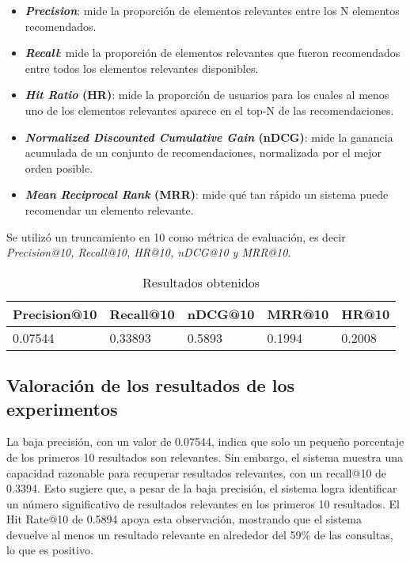 \documentclass[runningheads]{llncs}
\begin{document}
\begin{itemize}
    \item \textbf{\textit{Precision}}: mide la proporción de elementos relevantes entre los N elementos recomendados.
    \item \textbf{\textit{Recall}}: mide la proporción de elementos relevantes que fueron recomendados entre todos los elementos relevantes disponibles.
    \item \textbf{\textit{Hit Ratio} (HR)}: mide la proporción de usuarios para los cuales al menos uno de los elementos relevantes aparece en el top-N de las recomendaciones.
    \item \textbf{\textit{Normalized Discounted Cumulative Gain} (nDCG)}: mide la ganancia acumulada de un conjunto de recomendaciones, normalizada por el mejor orden posible.
     \item \textbf{\textit{ Mean Reciprocal Rank} (MRR)}: mide qué tan rápido un sistema puede recomendar un elemento relevante.
\end{itemize}

Se utilizó un  truncamiento en 10 como métrica de evaluación, es decir \textit{Precision@10, Recall@10, HR@10, nDCG@10 y MRR@10}.

\begin{table}[h]
    \centering
    \caption{Resultados obtenidos}\label{tab1}
    \begin{tabular}{|l|l|l|l|l|}
        \hline
            Precision@10 & Recall@10 & nDCG@10 & MRR@10 & HR@10\\
        \hline
            0.07544 & 0.33893 & 0.5893 & 0.1994 & 0.2008\\
        \hline
    \end{tabular}
\end{table}

\subsection{Valoración de los resultados de los experimentos}

La baja precisión, con un valor de 0.07544, indica que solo un pequeño porcentaje de los primeros 10 resultados son relevantes. Sin embargo, el sistema muestra una capacidad razonable para recuperar resultados relevantes, con un recall@10 de 0.3394. Esto sugiere que, a pesar de la baja precisión, el sistema logra identificar un número significativo de resultados relevantes en los primeros 10 resultados. El Hit Rate@10 de 0.5894 apoya esta observación, mostrando que el sistema devuelve al menos un resultado relevante en alrededor del 59\% de las consultas, lo que es positivo.
\end{document}
